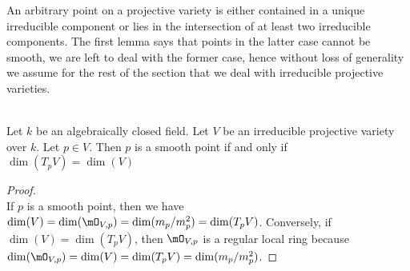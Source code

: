 \documentclass[a4paper]{article}
\begin{document}
An arbitrary point on a projective variety is either contained in a unique irreducible component or lies in the intersection of at least two irreducible components. The first lemma says that points in the latter case cannot be smooth, we are left to deal with the former case, hence without loss of generality we assume for the rest of the section that we deal with irreducible projective varieties. 

\begin{lmm}{}{}\\
Let $k$ be an algebraically closed field. Let $V$ be an irreducible projective variety over $k$. Let $p\in V$. Then $p$ is a smooth point if and only if $\dim(T_pV)=\dim(V)$
\begin{proof}\\
If $p$ is a smooth point, then we have $\dim(V)=\dim(\mO_{V,p})=\dim(m_p/m_p^2)=\dim(T_pV)$. Conversely, if $\dim(V)=\dim(T_pV)$, then $\mO_{V,p}$ is a regular local ring because $\dim(\mO_{V,p})=\dim(V)=\dim(T_pV)=\dim(m_p/m_p^2)$. 
\end{proof}
\end{lmm}
\end{document}

